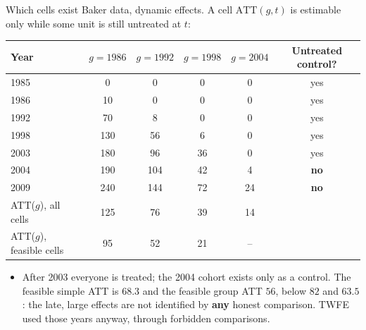 \documentclass[
  11pt,
  ignorenonframetext,
  aspectratio=169,
]{beamer}
\providecommand{\tightlist}{%
  \setlength{\itemsep}{0pt}\setlength{\parskip}{0pt}}
\begin{document}
\begin{frame}{Which cells exist}
\protect{}\label{which-cells-exist}
Baker data, dynamic effects. A cell \(\text{ATT}(g,t)\) is estimable
only while some unit is still untreated at \(t\):

\begin{center}\scriptsize
\begin{tabular}{lccccc}
\toprule
Year & $g = 1986$ & $g = 1992$ & $g = 1998$ & $g = 2004$ & Untreated control? \\
\midrule
1985 & 0 & 0 & 0 & 0 & yes \\
1986 & 10 & 0 & 0 & 0 & yes \\
1992 & 70 & 8 & 0 & 0 & yes \\
1998 & 130 & 56 & 6 & 0 & yes \\
2003 & 180 & 96 & 36 & 0 & yes \\
2004 & 190 & 104 & 42 & 4 & \textbf{no} \\
2009 & 240 & 144 & 72 & 24 & \textbf{no} \\
\midrule
ATT($g$), all cells & 125 & 76 & 39 & 14 & \\
ATT($g$), feasible cells & 95 & 52 & 21 & -- & \\
\bottomrule
\end{tabular}
\end{center}

\begin{itemize}
\tightlist
\item
  After 2003 everyone is treated; the 2004 cohort exists only as a
  control. The feasible simple ATT is \(68.3\) and the feasible group
  ATT \(56\), below \(82\) and \(63.5\): the late, large effects are not
  identified by \textbf{any} honest comparison. TWFE used those years
  anyway, through forbidden comparisons.
\end{itemize}
\end{frame}
\end{document}
